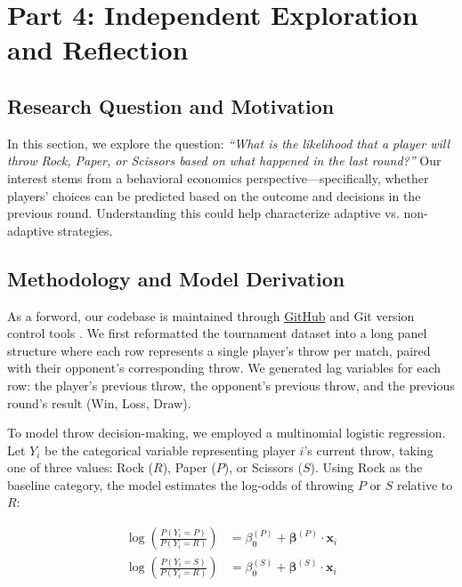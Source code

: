 \documentclass[12pt]{article}
\begin{document}
\newpage

\section*{Part 4: Independent Exploration and Reflection}

\subsection*{Research Question and Motivation}

In this section, we explore the question: \textit{“What is the likelihood that a player will throw Rock, Paper, or Scissors based on what happened in the last round?”} Our interest stems from a behavioral economics perspective—specifically, whether players' choices can be predicted based on the outcome and decisions in the previous round. Understanding this could help characterize adaptive vs. non-adaptive strategies.

\subsection*{Methodology and Model Derivation}

As a forword, our codebase is maintained through \href{https://github.com/adelatorre2/adelatorre2-competition-group-project-mt220}{GitHub} and Git version control tools \cite{noauthor_git_nodate}. We first reformatted the tournament dataset into a long panel structure where each row represents a single player's throw per match, paired with their opponent's corresponding throw. We generated lag variables for each row: the player's previous throw, the opponent's previous throw, and the previous round's result (Win, Loss, Draw).

To model throw decision-making, we employed a multinomial logistic regression. Let $Y_i$ be the categorical variable representing player $i$'s current throw, taking one of three values: Rock ($R$), Paper ($P$), or Scissors ($S$). Using Rock as the baseline category, the model estimates the log-odds of throwing $P$ or $S$ relative to $R$:

\begin{align*}
\log\left(\frac{P(Y_i = P)}{P(Y_i = R)}\right) &= \beta_{0}^{(P)} + \boldsymbol{\beta}^{(P)} \cdot \mathbf{x}_i \\
\log\left(\frac{P(Y_i = S)}{P(Y_i = R)}\right) &= \beta_{0}^{(S)} + \boldsymbol{\beta}^{(S)} \cdot \mathbf{x}_i
\end{align*}
\end{document}
